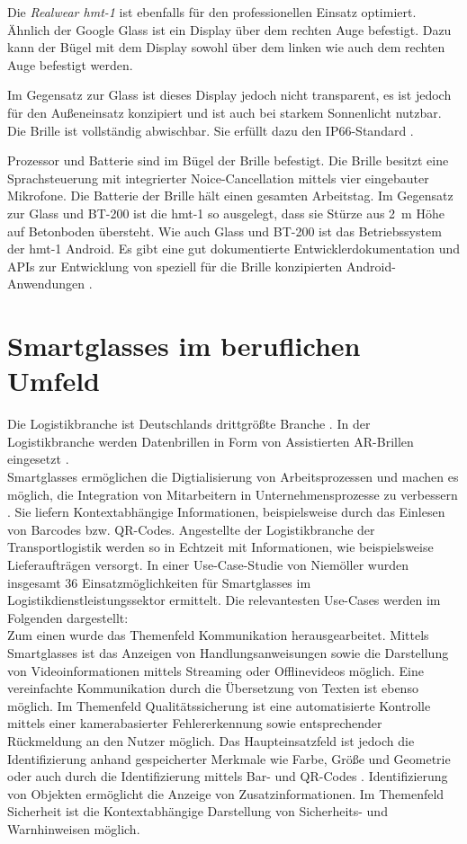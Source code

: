 Die \emph{Realwear hmt-1} ist ebenfalls für den professionellen Einsatz optimiert. Ähnlich der Google Glass ist ein Display über dem rechten Auge befestigt. Dazu kann der Bügel mit dem Display sowohl über dem linken wie auch dem rechten Auge befestigt werden.

Im Gegensatz zur Glass ist dieses Display jedoch nicht transparent, es ist jedoch für den Außeneinsatz konzipiert und ist auch bei starkem Sonnenlicht nutzbar. Die Brille ist vollständig abwischbar. Sie erfüllt dazu den IP66-Standard \cite{Realwear2018}.

Prozessor und Batterie sind im Bügel der Brille befestigt. Die Brille  besitzt eine Sprachsteuerung mit integrierter Noice-Cancellation mittels vier eingebauter Mikrofone. Die Batterie der Brille hält einen gesamten Arbeitstag. Im Gegensatz zur Glass und BT-200 ist die hmt-1 so ausgelegt, dass sie Stürze aus 2~m Höhe auf Betonboden übersteht. Wie auch Glass und BT-200 ist das Betriebssystem der hmt-1 Android. Es gibt eine gut dokumentierte Entwicklerdokumentation und APIs zur Entwicklung von speziell für die Brille konzipierten Android-Anwendungen \cite{Realwear2018}.
%
%
%
%
%
%
\section{Smartglasses im beruflichen Umfeld}
\label{sec:Smartglasses_im beruflichen_Umfeld}
Die Logistikbranche ist Deutschlands drittgrößte Branche \cite{Zobel2016}. In der Logistikbranche werden Datenbrillen in Form von Assistierten AR-Brillen eingesetzt \cite{Niemoller2017}.
\\
Smartglasses ermöglichen die Digtialisierung von Arbeitsprozessen und machen es möglich, die Integration von Mitarbeitern in Unternehmensprozesse zu verbessern \cite{Zobel2016}. Sie liefern Kontextabhängige Informationen, beispielsweise durch das Einlesen von Barcodes bzw. QR-Codes. Angestellte der Logistikbranche der Transportlogistik werden so in Echtzeit mit Informationen, wie beispielsweise Lieferaufträgen versorgt. In einer Use-Case-Studie von Niemöller \cite{Niemoller2017} wurden insgesamt 36 Einsatzmöglichkeiten für Smartglasses im Logistikdienstleistungssektor ermittelt. Die relevantesten Use-Cases werden im Folgenden dargestellt:
\\
Zum einen wurde das Themenfeld Kommunikation herausgearbeitet. Mittels Smartglasses ist das Anzeigen von Handlungsanweisungen sowie die Darstellung von Videoinformationen mittels Streaming oder Offlinevideos möglich. Eine vereinfachte Kommunikation durch die Übersetzung von Texten ist ebenso möglich. Im Themenfeld Qualitätssicherung ist eine automatisierte Kontrolle mittels einer kamerabasierter Fehlererkennung sowie entsprechender Rückmeldung an den Nutzer möglich. Das Haupteinsatzfeld ist jedoch die Identifizierung anhand gespeicherter Merkmale wie Farbe, Größe und Geometrie oder auch durch die Identifizierung mittels Bar- und QR-Codes \cite{Niemoller2017}. Identifizierung von Objekten ermöglicht die Anzeige von Zusatzinformationen. Im Themenfeld Sicherheit ist die Kontextabhängige Darstellung von Sicherheits- und Warnhinweisen möglich. 

